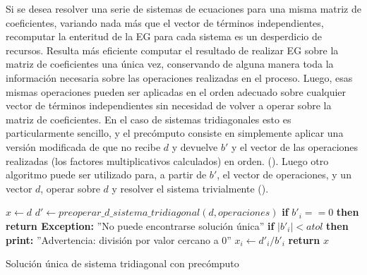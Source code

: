 Si se desea resolver una serie de sistemas de ecuaciones para una misma matriz de coeficientes, variando nada más que el vector de términos independientes, recomputar la enteritud de la EG para cada sistema es un desperdicio de recursos. Resulta más eficiente computar el resultado de realizar EG sobre la matriz de coeficientes una única vez, conservando de alguna manera toda la información necesaria sobre las operaciones realizadas en el proceso. Luego, esas mismas operaciones pueden ser aplicadas en el orden adecuado sobre cualquier vector de términos independientes sin necesidad de volver a operar sobre la matriz de coeficientes. En el caso de sistemas tridiagonales esto es particularmente sencillo, y el precómputo consiste en simplemente aplicar una versión modificada de  que no recibe $d$ y devuelve $b'$ y el vector de las operaciones realizadas (los factores multiplicativos calculados) en orden. (). Luego otro algoritmo puede ser utilizado para, a partir de $b'$, el vector de operaciones, y un vector $d$, operar sobre $d$ y resolver el sistema trivialmente ().

\begin{algorithm}[H]
\begin{algorithmic}[1]
    \State $x \gets d$ 
    \State $d' \gets preoperar\_d\_sistema\_tridiagonal(d, operaciones)$ 
         \State \textbf{if} $b'_i==0$ \textbf{then return Exception:} ''No puede encontrarse solución única''
        \State \textbf{if} $|b'_i| < atol$ \textbf{then print:} ''Advertencia: división por valor cercano a 0''
        \State $x_i \gets d'_i/b'_i$
        \EndFor
    \State \textbf{return} $x$
\EndFunction
\end{algorithmic}
\caption{Solución única de sistema tridiagonal con precómputo}
\label{alg:sol_tridiag_precomputo}
\end{algorithm}


